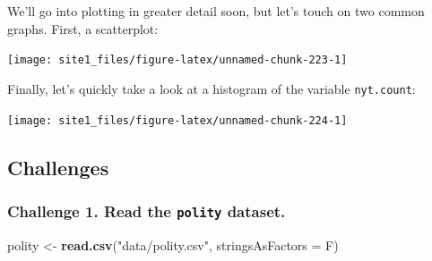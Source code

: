 \documentclass[]{book}
\newenvironment{Shaded}{\begin{snugshade}}{\end{snugshade}}
\newcommand{\KeywordTok}[1]{\textcolor[rgb]{0.13,0.29,0.53}{\textbf{#1}}}
\newcommand{\DataTypeTok}[1]{\textcolor[rgb]{0.13,0.29,0.53}{#1}}
\newcommand{\DecValTok}[1]{\textcolor[rgb]{0.00,0.00,0.81}{#1}}
\newcommand{\StringTok}[1]{\textcolor[rgb]{0.31,0.60,0.02}{#1}}
\newcommand{\OperatorTok}[1]{\textcolor[rgb]{0.81,0.36,0.00}{\textbf{#1}}}
\newcommand{\NormalTok}[1]{#1}
\begin{document}
We'll go into plotting in greater detail soon, but let's touch on two
common graphs. First, a scatterplot:

\begin{Shaded}
\end{Shaded}

\begin{center}\texttt{[image: site1\_files/figure-latex/unnamed-chunk-223-1]} \end{center}

Finally, let's quickly take a look at a histogram of the variable
\texttt{nyt.count}:

\begin{Shaded}
\end{Shaded}

\begin{center}\texttt{[image: site1\_files/figure-latex/unnamed-chunk-224-1]} \end{center}

\subsection{Challenges}\label{challenges-10}

\subsubsection*{\texorpdfstring{Challenge 1. Read the \texttt{polity}
dataset.}{Challenge 1. Read the polity dataset.}}\label{challenge-1.-read-the-polity-dataset.}

\begin{Shaded}
\begin{Highlighting}[]
\NormalTok{polity <-}\StringTok{ }\KeywordTok{read.csv}\NormalTok{(}\StringTok{"data/polity.csv"}\NormalTok{, }\DataTypeTok{stringsAsFactors =}\NormalTok{ F)}
\end{Highlighting}
\end{Shaded}
\end{document}
